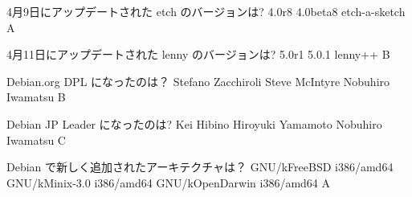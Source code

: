 
 \santaku
 {4月9日にアップデートされた etch のバージョンは?}
 {4.0r8}
 {4.0beta8}
 {etch-a-sketch}
 {A}
{}

 \santaku
 {4月11日にアップデートされた lenny のバージョンは?}
 {5.0r1}
 {5.0.1}
 {lenny++}
 {B}
{}

 \santaku
 {Debian.org DPL になったのは？}
 {Stefano Zacchiroli}
 {Steve McIntyre}
 {Nobuhiro Iwamatsu}
 {B}
{}

 \santaku
 {Debian JP Leader になったのは?}
 {Kei Hibino}
 {Hiroyuki Yamamoto}
 {Nobuhiro Iwamatsu}
 {C}
{}

 \santaku
 {Debian で新しく追加されたアーキテクチャは？}
 {GNU/kFreeBSD i386/amd64}
 {GNU/kMinix-3.0 i386/amd64}
 {GNU/kOpenDarwin i386/amd64}
 {A}
{}
